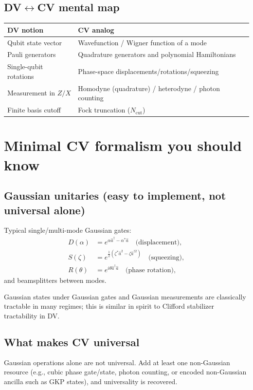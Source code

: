 \documentclass[11pt]{article}
\begin{document}
\subsection*{DV$\leftrightarrow$CV mental map}
\begin{center}
\begin{tabular}{ll}
\toprule
DV notion & CV analog \\
\midrule
Qubit state vector & Wavefunction / Wigner function of a mode \\
Pauli generators & Quadrature generators and polynomial Hamiltonians \\
Single-qubit rotations & Phase-space displacements/rotations/squeezing \\
Measurement in $Z/X$ & Homodyne (quadrature) / heterodyne / photon counting \\
Finite basis cutoff & Fock truncation ($N_{\text{cut}}$) \\
\bottomrule
\end{tabular}
\end{center}

\section{Minimal CV formalism you should know}

\subsection{Gaussian unitaries (easy to implement, not universal alone)}
Typical single/multi-mode Gaussian gates:
\begin{align}
D(\alpha) &= e^{\alpha \hat a^\dagger-\alpha^*\hat a} \quad \text{(displacement)},\\
S(\zeta) &= e^{\frac{1}{2}(\zeta^*\hat a^2-\zeta \hat a^{\dagger 2})} \quad \text{(squeezing)},\\
R(\theta) &= e^{i\theta \hat a^\dagger\hat a} \quad \text{(phase rotation)},
\end{align}
and beamsplitters between modes.

Gaussian states under Gaussian gates and Gaussian measurements are classically tractable in many regimes; this is similar in spirit to Clifford stabilizer tractability in DV.

\subsection{What makes CV universal}
Gaussian operations alone are not universal. Add at least one non-Gaussian resource (e.g., cubic phase gate/state, photon counting, or encoded non-Gaussian ancilla such as GKP states), and universality is recovered.
\end{document}
